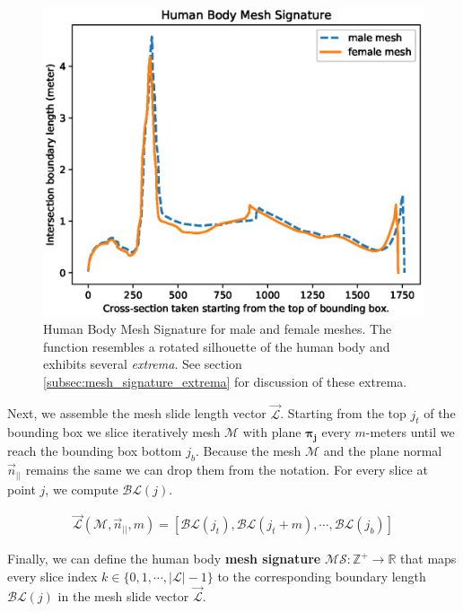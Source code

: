 \documentclass[runningheads, orivec]{llncs}
\begin{document}
\begin{figure}[t]
	\begin{center}
		\includegraphics[width=\linewidth]{Figure_1.eps}
	\end{center}
	\caption{Human Body Mesh Signature for male and female meshes. The 
		function resembles a rotated silhouette of the human body and exhibits 
		several \textit{extrema}. See section 
		\ref{subsec:mesh_signature_extrema} for discussion of these extrema.}
	\label{fig:hbm_signature}
\end{figure}

Next, we assemble the mesh slide length vector $\vec{\mathcal{L}}$. Starting 
from the 
top $j_t$ of the bounding box we slice iteratively mesh $\mathcal{M}$ with 
plane 
$\boldsymbol{\pi_j}$ every $m$-meters until we reach the bounding box bottom 
$j_b$. Because the mesh $\mathcal{M}$ and the plane normal $\vec{n}_{||}$ 
remains the same we can drop them from the notation. For every slice at point 
$j$, we compute $\mathcal{BL}(j)$.

\begin{align}
\vec{\mathcal{L}}(\mathcal{M}, \vec{n}_{||}, m) = \left[ \mathcal{BL}(j_t), 
\mathcal{BL}(j_t+m), \cdots, \mathcal{BL}(j_b) \right]
\end{align}

Finally, we can define the human body \textbf{mesh signature} $\mathcal{MS}: 
\mathbb{Z}^+ \to \mathbb{R}$ that maps every slice index $k \in \{0, 1, \cdots, 
|\mathcal{L}|-1\}$ to the corresponding boundary length $\mathcal{BL}(j)$ in 
the mesh slide vector $\vec{\mathcal{L}}$.
\end{document}
